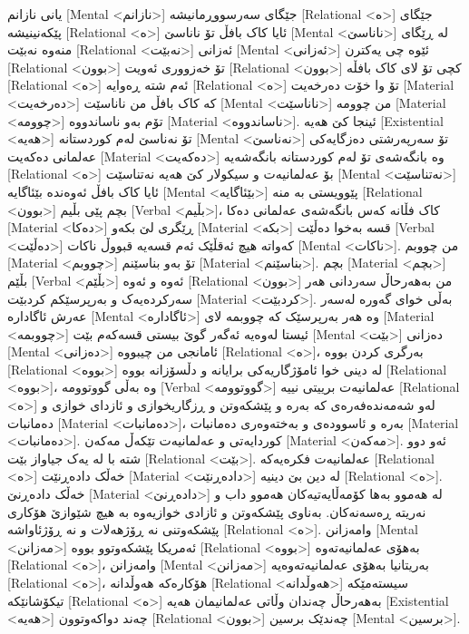 یانی نازانم [Mental <نازانم>] جێگای سەرسووڕمانیشە [Relational <ە>] جێگای پێکەنینیشە [Relational <ە>] ئایا کاک بافڵ تۆ ناناسێ [Mental <ناناسێ>] لە ڕێگای منەوە نەبێت [Relational <نەبێت>] ئەزانی [Mental <ئەزانی>] ئێوە چی یەکترن [Relational <بوون>] تۆ خەزووری ئەویت [Relational <بوون>] کچی تۆ لای کاک بافڵە [Relational <ە>] ئەم شته ڕەوایە [Relational <ە>] تۆ وا خۆت دەرخەیت [Material <دەرخەیت>] کە کاک بافڵ من ناناسێت [Mental <ناناسێت>] من چوومە [Material <چوومە>] تۆم بەو ناساندووە [Material <ناساندووە>].
ئینجا کێ هەیە [Existential <هەیە>] تۆ نەناسێ لەم کوردستانە [Mental <نەناسێ>] تۆ سەرپەرشتی دەزگایەکی عەلمانی دەکەیت [Material <دەکەیت>] وە بانگەشەی تۆ لەم کوردستانە بانگەشەیە [Relational <ە>] بۆ عەلمانیەت و سیکولار کێ هەیە نەتناسێت [Mental <نەتناسێت>] ئایا کاک بافڵ ئەوەندە بێئاگایه [Mental <بێئاگایه>] پێوویستی بە منە [Relational <بوون>] بچم پێی بڵیم [Verbal <بڵیم>]، کاک فڵانە کەس بانگەشەی عەلمانی دەکا [Material <دەکا>] ڕێگری لێ بکەو [Material <بکە>] قسە بەخوا دەڵێت [Verbal <دەڵێت>] کەواتە هیچ ئەقڵێک ئەم قسەیە قبووڵ ناکات [Mental <ناکات>]. من چووبم [Material <چووبم>] تۆ بەو بناسێنم [Material <بناسێنم>]. بچم [Material <بچم>] بڵێم [Verbal <بڵێم>] ئەوە و ئەوە [Relational <بوون>] من بەهەرحاڵ سەردانی هەر سەرکردەیەک و بەرپرسێکم کردبێت [Material <کردبێت>].
بەڵی خوای گەورە لەسەر عەرش ئاگادارە [Mental <ئاگادارە>] وە هەر بەرپرسێک کە چووبمە لای [Material <چووبمە>] ئیستا لەوەیە ئەگەر گوێ بیستی قسەکەم بێت [Mental <بێت>] دەزانی [Mental <دەزانی>] ئامانجی من چیبووە [Relational <ە>]، بەرگری کردن بووە [Relational <بووە>] لە دینی خوا ئامۆژگاریەکی برایانە و دڵسۆزانە بووە [Relational <بووە>]، وە بەڵی گووتوومە [Verbal <گووتوومە>] عەلمانیەت برییتی نییە [Relational <ە>] لەو شەمەندەفەرەی کە بەرە و پێشکەوتن و ڕزگاریخوازی و ئازدای خوازی و دەمانبات [Material <دەمانبات>]، بەرە و ئاسوودەی و بەختەوەری دەمانبات [Material <دەمانبات>]. کوردایەتی و عەلمانیەت تێکەڵ مەکەن [Material <مەکەن>]. ئەو دوو شتە با لە یەک جیاواز بێت [Relational <بێت>].
عەلمانیەت فکرەیەکە [Relational <ە>] خەڵک دادەڕنێت [Material <دادەڕنێت>] لە دین بێ دینیە [Relational <ە>]. خەڵک دادەڕنێ [Material <دادەڕنێ>] لە هەموو بەها کۆمەڵایەتیەکان هەموو داب و نەریتە ڕەسەنەکان. بەناوی پێشکەوتن و ئازادی خوازیەوە بە هیچ شێوازێ هۆکاری پێشکەوتنی نە ڕۆژهەلات و نە ڕۆژئاواشە [Relational <ە>]. وامەزانن [Mental <مەزانن>] ئەمریکا پێشکەوتوو بووە [Relational <بووە>] بەهۆی عەلمانیەتەوە [Relational <ە>]، وامەزانن [Mental <مەزانن>] بەریتانیا بەهۆی عەلمانیەتەوەیە [Relational <ە>]، هۆکارەکە هەوڵدانە [Relational <هەوڵدانە>] سیستەمێکە تیکۆشانێکە [Relational <ە>] بەهەرحاڵ چەندان وڵاتی عەلمانیمان هەیە [Existential <هەیە>] چەند دواکەوتوون [Relational <بوون>] چەندێک برسین [Mental <برسین>].
